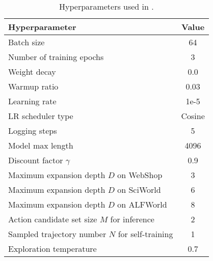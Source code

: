 \begin{table*}[tb]
\caption{Hyperparameters used in {\ours}.}
\label{tab:hyper-params}
\centering
\begin{tabular}{lc}
\toprule
\textbf{Hyperparameter}          & \textbf{Value} \\ 
\midrule
Batch size                       & 64             \\ \hline
Number of training epochs        & 3              \\ \hline
Weight decay                     & 0.0            \\ \hline
Warmup ratio                     & 0.03           \\ \hline
Learning rate                    & 1e-5           \\ \hline
LR scheduler type                & Cosine         \\ \hline
Logging steps                    & 5              \\ \hline
Model max length                 & 4096           \\ \hline
Discount factor $\gamma$ & 0.9 \\ \hline
Maximum expansion depth $D$ on WebShop & 3 \\ \hline
Maximum expansion depth $D$ on SciWorld & 6 \\ \hline
Maximum expansion depth $D$ on ALFWorld & 8 \\ \hline
Action candidate set size $M$ for inference   & 2 \\ \hline
Sampled trajectory number $N$ for self-training  & 1 \\ \hline
Exploration temperature & 0.7 \\
\bottomrule
\end{tabular}
\end{table*}